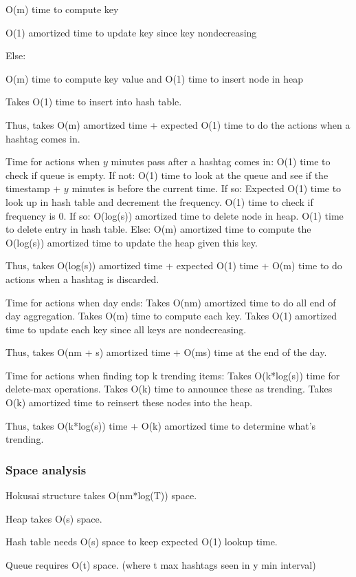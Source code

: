 \documentclass[a4paper,12pt]{article}
\begin{document}
		O(m) time to compute key 

		O(1) amortized time to update key since key nondecreasing

	Else: 

		O(m) time to compute key value and O(1) time to insert node in heap

		Takes O(1) time to insert into hash table. 


Thus, takes O(m) amortized time + expected O(1) time to do the actions when a hashtag comes in.


Time for actions when $y$ minutes pass after a hashtag comes in:
	O(1) time to check if queue is empty.  If not:
		O(1) time to look at the queue and see if the timestamp + $y$ minutes is before the current time.  If so:
			Expected O(1) time to look up in hash table and decrement the frequency.
			O(1) time to check if frequency is 0.  If so:
				O(log(s)) amortized time to delete node in heap.
				O(1) time to delete entry in hash table.
			Else:
				O(m) amortized time to compute the 
				O(log(s)) amortized time to update the heap given this key.

Thus, takes O(log(s)) amortized time + expected O(1) time  + O(m) time to do actions when a hashtag is discarded.
			

Time for actions when day ends:
Takes O(nm) amortized time to do all end of day aggregation.
Takes O(m) time to compute each key.
Takes O(1) amortized time to update each key since all keys are nondecreasing.

Thus, takes O(nm + s) amortized time + O(ms) time at the end of the day.

Time for actions when finding top k trending items:
	Takes O(k*log(s)) time for delete-max operations.
	Takes O(k) time to announce these as trending.
Takes O(k) amortized time to reinsert these nodes into the heap.

Thus, takes O(k*log(s)) time + O(k) amortized time to determine what’s trending.



\subsubsection{Space analysis}

Hokusai structure takes O(nm*log(T)) space.

Heap takes O(s) space.

Hash table needs O(s) space to keep expected O(1) lookup time.

Queue requires O(t) space. (where t max hashtags seen in y min interval)
\end{document}
